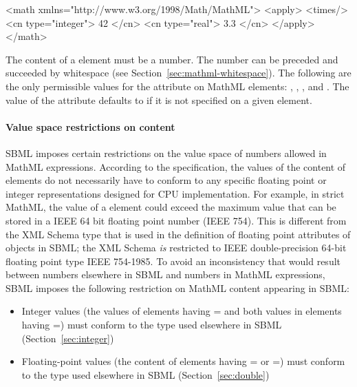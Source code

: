 \begin{example}
<math xmlns="http://www.w3.org/1998/Math/MathML">
    <apply>
        <times/> <cn type="integer"> 42 </cn> <cn type="real"> 3.3 </cn>
    </apply>
</math>
\end{example}

The content of a  element must be a number.  The number
can be preceded and succeeded by whitespace (see
Section~\ref{sec:mathml-whitespace}).  The following are the only
permissible values for the  attribute on MathML
 elements: , , ,
and .  The value of the  attribute
defaults to  if it is not specified on a given
 element.


\paragraph{Value space restrictions on  content}

SBML imposes certain restrictions on the value space of numbers
allowed in MathML expressions.  According to the \mathmltwo
specification, the values of the content of  elements do
not necessarily have to conform to any specific floating point or
integer representations designed for CPU implementation.  For
example, in strict MathML, the value of a  element could
exceed the maximum value that can be stored in a IEEE 64 bit
floating point number (IEEE 754).  This is different from the XML
Schema type  that is used in the definition of
floating point attributes of objects in SBML; the XML Schema
 \emph{is} restricted to IEEE double-precision
64-bit floating point type IEEE 754-1985.  To avoid an
inconsistency that would result between numbers elsewhere in SBML
and numbers in MathML expressions, SBML \thisLV imposes the
following restriction on MathML content appearing in SBML:
\begin{itemize}
  
\item Integer values (\ie the values of  elements
  having = and both values in  elements
  having =) must conform to the
   type used elsewhere in SBML
  (Section~\ref{sec:integer})
  
\item Floating-point values (\ie the content of 
  elements having = or
  =) must conform to the
   type used elsewhere in SBML
  (Section~\ref{sec:double})
\end{itemize}


